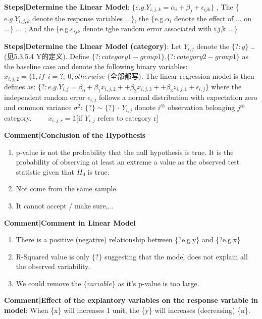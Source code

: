 \documentclass[9pt]{article}
\begin{document}
    \textbf{Steps|Determine the Linear Model}: $\{e.g.Y_{i,j,k}=\alpha_i+\beta_j+\epsilon_{ijk}\}$ , The \{$e.g.Y_{i,j,k}$ denote the response variables ...\}, the \{e.g.$\alpha_i$ denote the effect of ... on ...\} ... ; And the \{e.g.$\varepsilon_{ijk}$ denote tghe random error associated with i,j,k ...\}

    \textbf{Steps|Determine the Linear Model (category)}: Let $Y_{i,j}$ denote the $\{?:y\}$ .. (见5.3,5.4 Y的定义). Define $\{?:category1-group1\}$,$\{?:category2-group1\}$ as the baseline case and denote the following binary variables: $x_{i,j,2}=\{1,if \ \ i=?; \ 0,otherwise$ (全部都写). The linear regression model is then defines as: $\{?:e.g.Y_{i,j}=\beta_0+\beta_1x_{i,j,2}++\beta_2x_{i,j,3}++\beta_3z_{i,j,1}+\epsilon_{i,j}\}$ where the independent random error $\epsilon_{i,j}$ follows a normal distribution with expectation zero and common variance $\sigma^2$: $\{?\}\sim\{?\}$ $\cdot$ $Y_{i,j}$ donote $i^{th}$ observation belonging $j^{th}$ category. \ \ \ \ $x_{i,j;r}=\mathbb{1}[$if $Y_{i,j}$ refers to category r$]$

\textbf{Comment|Conclusion of the Hypothesis}
\begin{enumerate}[itemsep=-3pt, topsep=-2pt]
    \item p-value is not the probability that the null hypothesis is true. It is the probability of observing at least an extreme a value as the observed test statistic given that $H_0$ is true.
    \item Not come from the same sample.
    \item It cannot accept / make sure,...
\end{enumerate}

\textbf{Comment|Comment in Linear Model}
\begin{enumerate}[itemsep=-3pt, topsep=-2pt]
    \item There is a positive (negative) relationship between \{?e.g.y\} and \{?e.g.x\}
    \item R-Squared value is only $\{?\}$ suggesting that the model does not explain all the observed variability.
    \item We could remove the $\{variable\}$ as it's p-value is too large.
\end{enumerate}

\textbf{Comment|Effect of the explantory variables on the response variable in model}:  When \{x\} will increases 1 unit, the \{y\} will increases (decreasing) \{n\}.
\end{document}
